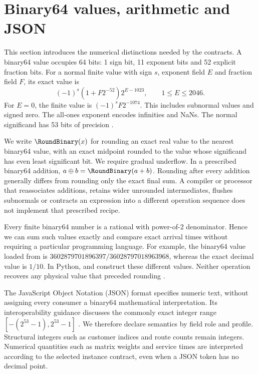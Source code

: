 \section{Binary64 values, arithmetic and JSON}\label{sec:binary64}
This section introduces the numerical distinctions needed by the contracts. A binary64 value occupies 64 bits: 1 sign bit, 11 exponent bits and 52 explicit fraction bits. For a normal finite value with sign $s$, exponent field $E$ and fraction field $F$, its exact value is
\[
(-1)^s(1+F2^{-52})2^{E-1023},\qquad 1\leq E\leq2046.
\]
For $E=0$, the finite value is $(-1)^s F2^{-1074}$. This includes subnormal values and signed zero. The all-ones exponent encodes infinities and NaNs. The normal significand has 53 bits of precision \autocite{oracleIEEEArithmetic}.

We write $\RoundBinary(x)$ for rounding an exact real value to the nearest binary64 value, with an exact midpoint rounded to the value whose significand has even least significant bit. We require gradual underflow. In a prescribed binary64 addition, $a\oplus b=\RoundBinary(a+b)$. Rounding after every addition generally differs from rounding only the exact final sum. A compiler or processor that reassociates additions, retains wider unrounded intermediates, flushes subnormals or contracts an expression into a different operation sequence does not implement that prescribed recipe.

Every finite binary64 number is a rational with power-of-2 denominator. Hence we can sum such values exactly and compare exact arrival times without requiring a particular programming language. For example, the binary64 value loaded from  is $3602879701896397/36028797018963968$, whereas the exact decimal value is $1/10$. In Python,  and  construct these different values. Neither operation recovers any physical value that preceded rounding \autocite{pythonFloatingPoint2026,pythonFractions2026}.

The JavaScript Object Notation (JSON) format specifies numeric text, without assigning every consumer a binary64 mathematical interpretation. Its interoperability guidance discusses the commonly exact integer range $[-(2^{53}-1),2^{53}-1]$ \autocite{brayJSON2017}. We therefore declare semantics by field role and profile. Structural integers such as customer indices and route counts remain integers. Numerical quantities such as matrix weights and service times are interpreted according to the selected instance contract, even when a JSON token has no decimal point.

